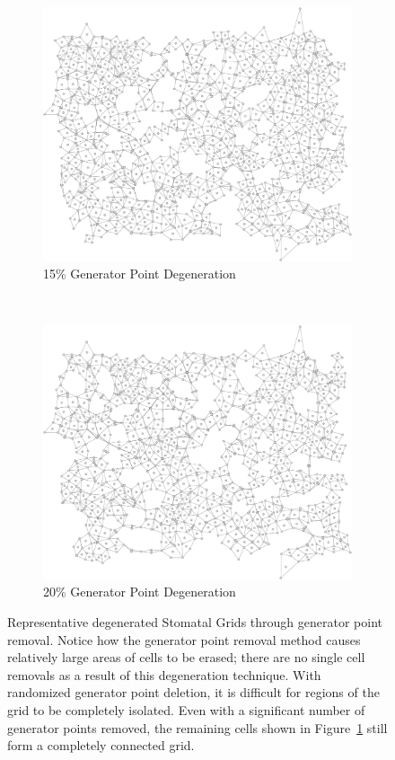\documentclass[a4paper,11pt]{article}
\begin{document}
\begin{figure}[htp]
\begin{subfigure}[t]{0.45\textwidth}
  \centering
  \includegraphics[width=\textwidth]{ch6_figs/degen_stoma_15_grid}
  \caption{15\% Generator Point Degeneration}
  \end{subfigure}
~
\begin{subfigure}[t]{0.45\textwidth}
  \centering
  \includegraphics[width=\textwidth]{ch6_figs/degen_stoma_20_grid}
  \caption{20\% Generator Point Degeneration}
  \label{fig:stoma_gen_pt_20}
  \end{subfigure}

\caption[Stomatal Generator Point Degeneration]{
  Representative degenerated Stomatal Grids through generator point removal. Notice how the generator point removal method causes relatively large areas of cells to be erased; there are no single cell removals as a result of this degeneration technique. With randomized generator point deletion, it is difficult for regions of the grid to be completely isolated. Even with a significant number of generator points removed, the remaining cells shown in Figure~\ref{fig:stoma_gen_pt_20} still form a completely connected grid.
}
\label{fig:stoma_gen_pt_degen}
\end{figure}
\end{document}
